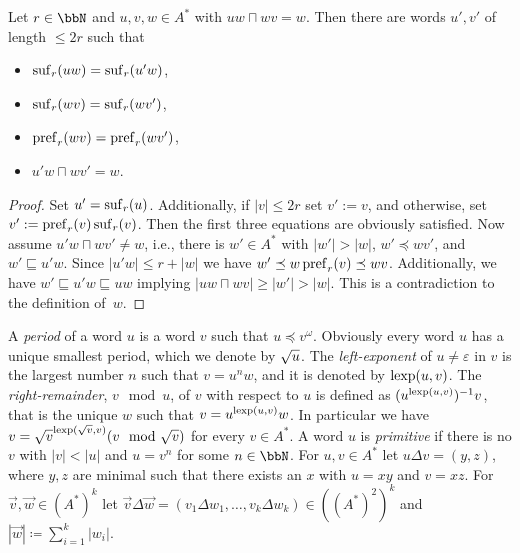 \begin{lemma}\label{lem:short_ends_construction}
	Let $r\in\bbN$ and $u,v,w \in A^\ast$ with $uw\sqcap wv = w$. %
	Then there are words $u',v'$ of length $\leq 2r$ such that 
	
	\begin{minipage}{0.45\linewidth}
	\begin{itemize}
		\item $\operatorname{suf}_r(uw) = \operatorname{suf}_r(u'w)$,
		\item $\operatorname{suf}_r(wv) = \operatorname{suf}_r(wv')$,
	\end{itemize}
    \end{minipage}
    \begin{minipage}{0.45\linewidth}
    	\begin{itemize}
    		\item $\operatorname{pref}_r(wv) = \operatorname{pref}_r(wv')$,
    		\item $u'w\sqcap wv' = w$.
    	\end{itemize}
    \end{minipage}
\end{lemma}
\begin{proof}
	Set $u'=\operatorname{suf}_r(u)$. Additionally, if $|v|\leq 2r$ set $v':=v$, and otherwise, set $v':=\operatorname{pref}_r(v)\operatorname{suf}_r(v)$. Then the first three equations are obviously satisfied. Now assume $u'w\sqcap wv'\neq w$, i.e., there is $w'\in A^*$ with $|w'|>|w|$, $w'\preceq wv'$, and $w'\sqsubseteq u'w$. Since $|u'w|\leq r+|w|$ we have $w'\preceq w\operatorname{pref}_r(v)\preceq wv$. Additionally, we have $w'\sqsubseteq u'w\sqsubseteq uw$ implying $|uw\sqcap wv|\geq|w'|>|w|$. This is a contradiction to the definition of~$w$.
\end{proof}

A \emph{period} of a word $u$ is a word $v$ such that $u \preceq v^\omega$. Obviously every word $u$ has a unique smallest period, which we denote by $\sqrt{u}$. The \emph{left-exponent} of $u\neq\varepsilon$ in $v$ is the largest number $n$ such that $v= u^nw$, and it is denoted by $\operatorname{lexp}(u,v)$. The \emph{right-remainder}, $v\mod u$,  of $v$ with respect to $u$ is defined as $(u^{\operatorname{lexp}(u,v)})^{-1}v$, that is the unique $w$ such that $v= u^{\operatorname{lexp}(u,v)}w$.  In particular we have $v= \root{v}^{\lexp(\root{v}, v)}(v \mod \root{v})$ for every $v\in A^\ast$. A word $u$ is \emph{primitive} if there is no $v$ with
$|v| < |u|$ and $u = v^n$ for some $n\in\bbN$.
For $u,v\in A^\ast$ let $u\Delta v = (y,z)$, where $y,z$ are minimal such that there exists an $x$ with $u=xy$ and $v=xz$. For $\vec{v}, \vec{w}\in(A^\ast)^k$ let 
$\vec{v}\Delta\vec{w} = (v_1\Delta w_1,\ldots, v_k\Delta w_k) \in ((A^\ast)^2)^k$ and $|\vec{w}| \coloneq \sum_{i=1}^{k}|w_i|$. 

